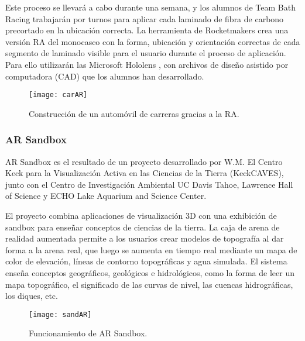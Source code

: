 Este proceso se llevará a cabo durante una semana, y los alumnos de Team Bath Racing trabajarán por turnos para aplicar cada laminado de fibra de carbono precortado en la ubicación correcta. La herramienta de Rocketmakers crea una versión RA del monocasco con la forma, ubicación y orientación correctas de cada segmento de laminado visible para el usuario durante el proceso de aplicación. Para ello utilizarán las Microsoft Hololens \cite{URL::hololens}, con archivos de diseño asistido por computadora (CAD) que los alumnos han desarrollado.

\begin{figure}[h]
    \centering
    \texttt{[image: carAR]}
    \caption{Construcción de un automóvil de carreras gracias a la RA.}
    \label{fig:xyz}
\end{figure}    
 

\subsubsection{AR Sandbox} 
AR Sandbox \cite{URL::sandbox} es el resultado de un proyecto desarrollado por W.M. El Centro Keck para la Visualización Activa en las Ciencias de la Tierra (KeckCAVES), junto con el Centro de Investigación Ambiental UC Davis Tahoe, Lawrence Hall of Science y ECHO Lake Aquarium and Science Center.

El proyecto combina aplicaciones de visualización 3D con una exhibición de sandbox para enseñar conceptos de ciencias de la tierra. La caja de arena de realidad aumentada  permite a los usuarios crear modelos de topografía al dar forma a la arena real, que luego se aumenta en tiempo real mediante un mapa de color de elevación, líneas de contorno topográficas y agua simulada. El sistema enseña conceptos geográficos, geológicos e hidrológicos, como la forma de leer un mapa topográfico, el significado de las curvas de nivel, las cuencas hidrográficas, los diques, etc.

\begin{figure}[h]
    \centering
    \texttt{[image: sandAR]}
    \caption{Funcionamiento de AR Sandbox.}
    \label{fig:xyz}
\end{figure}    




